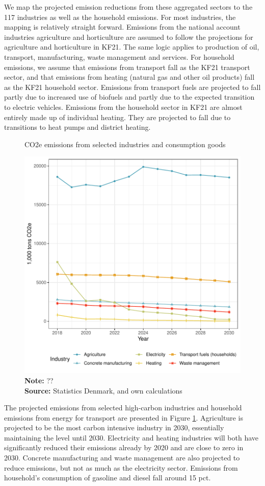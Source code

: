 We map the projected emission reductions from these aggregated sectors to the 117 industries as well as the household emissions. For most industries, the mapping is relatively straight forward. Emissions from the national account industries agriculture and horticulture are assumed to follow the projections for agriculture and horticulture in KF21. The same logic applies to production of oil, transport, manufacturing, waste management and services. For household emissions, we assume that emissions from transport fall as the KF21 transport sector, and that emissions from heating (natural gas and other oil products) fall as the KF21 household sector. Emissions from transport fuels are projected to fall partly due to increased use of biofuels and partly due to the expected transition to electric vehicles. Emissions from the household sector in KF21 are almost entirely made up of individual heating. They are projected to fall due to transitions to heat pumps and district heating.

\begin{figure}[H]
\centering
\caption{CO2e emissions from selected industries and consumption goods}
\label{emissions2030}
\includegraphics[width=.9\textwidth]{Figures/emissionkf21.pdf}
\captionsetup{singlelinecheck=off,size=scriptsize}
\setlength{\captionmargin}{10pt}
\caption*{
\textbf{Note:} ??\\
\textbf{Source:} Statistics Denmark, \cite{kf21} and own calculations}
\end{figure}
The projected emissions from selected high-carbon industries and household emissions from energy for transport are presented in Figure \ref{emissions2030}. Agriculture is projected to be the most carbon intensive industry in 2030, essentially maintaining the level until 2030. Electricity and heating industries will both have significantly reduced their emissions already by 2020 and are close to zero in 2030. Concrete manufacturing and waste management are also projected to reduce emissions, but not as much as the electricity sector. Emissions from household's consumption of gasoline and diesel fall around 15 pct. 

